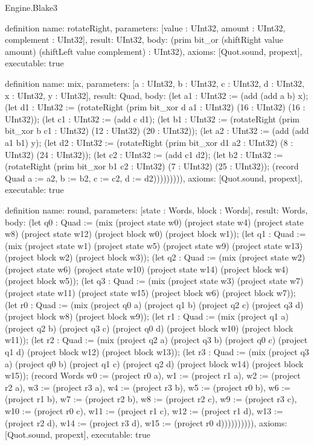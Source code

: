 \begin{lexlean}{Engine.Blake3}
\begin{semanticmodule}
definition{
  name: rotateRight,
  parameters: [value : UInt32, amount : UInt32, complement : UInt32],
  result: UInt32,
  body: (prim bit_or (shiftRight value amount) (shiftLeft value complement) : UInt32),
  axioms: [Quot.sound, propext],
  executable: true
}

definition{
  name: mix,
  parameters: [a : UInt32, b : UInt32, c : UInt32, d : UInt32, x : UInt32, y : UInt32],
  result: Quad,
  body: (let a1 : UInt32 := (add (add a b) x); (let d1 : UInt32 := (rotateRight (prim bit_xor d a1 : UInt32) (16 : UInt32) (16 : UInt32)); (let c1 : UInt32 := (add c d1); (let b1 : UInt32 := (rotateRight (prim bit_xor b c1 : UInt32) (12 : UInt32) (20 : UInt32)); (let a2 : UInt32 := (add (add a1 b1) y); (let d2 : UInt32 := (rotateRight (prim bit_xor d1 a2 : UInt32) (8 : UInt32) (24 : UInt32)); (let c2 : UInt32 := (add c1 d2); (let b2 : UInt32 := (rotateRight (prim bit_xor b1 c2 : UInt32) (7 : UInt32) (25 : UInt32)); (record Quad {a := a2, b := b2, c := c2, d := d2}))))))))),
  axioms: [Quot.sound, propext],
  executable: true
}

definition{
  name: round,
  parameters: [state : Words, block : Words],
  result: Words,
  body: (let q0 : Quad := (mix (project state w0) (project state w4) (project state w8) (project state w12) (project block w0) (project block w1)); (let q1 : Quad := (mix (project state w1) (project state w5) (project state w9) (project state w13) (project block w2) (project block w3)); (let q2 : Quad := (mix (project state w2) (project state w6) (project state w10) (project state w14) (project block w4) (project block w5)); (let q3 : Quad := (mix (project state w3) (project state w7) (project state w11) (project state w15) (project block w6) (project block w7)); (let r0 : Quad := (mix (project q0 a) (project q1 b) (project q2 c) (project q3 d) (project block w8) (project block w9)); (let r1 : Quad := (mix (project q1 a) (project q2 b) (project q3 c) (project q0 d) (project block w10) (project block w11)); (let r2 : Quad := (mix (project q2 a) (project q3 b) (project q0 c) (project q1 d) (project block w12) (project block w13)); (let r3 : Quad := (mix (project q3 a) (project q0 b) (project q1 c) (project q2 d) (project block w14) (project block w15)); (record Words {w0 := (project r0 a), w1 := (project r1 a), w2 := (project r2 a), w3 := (project r3 a), w4 := (project r3 b), w5 := (project r0 b), w6 := (project r1 b), w7 := (project r2 b), w8 := (project r2 c), w9 := (project r3 c), w10 := (project r0 c), w11 := (project r1 c), w12 := (project r1 d), w13 := (project r2 d), w14 := (project r3 d), w15 := (project r0 d)}))))))))),
  axioms: [Quot.sound, propext],
  executable: true
}


\end{semanticmodule}
\end{lexlean}

